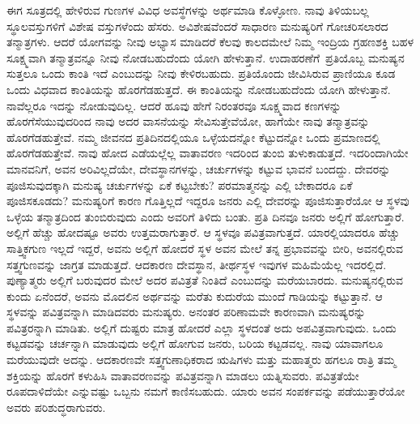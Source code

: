 ಈಗ ಸೂತ್ರದಲ್ಲಿ ಹೇಳಿರುವ ಗುಣಗಳ ವಿವಿಧ ಅವಸ್ಥೆಗಳನ್ನು ಅರ್ಥಮಾಡಿ ಕೊಳ್ಳೋಣ. ನಾವು ತಿಳಿಯಬಲ್ಲ ಸ್ಥೂಲವಸ್ತುಗಳಿಗೆ ವಿಶೇಷ ವಸ್ತುಗಳೆಂದು ಹೆಸರು. ಅವಿಶೇಷವೆಂದರೆ ಸಾಧಾರಣ ಮನುಷ್ಯರಿಗೆ ಗೋಚರಿಸಲಾರದ ತನ್ಮಾತ್ರಗಳು. ಆದರೆ ಯೋಗವನ್ನು ನೀವು ಅಭ್ಯಾಸ ಮಾಡಿದರೆ ಕೆಲವು ಕಾಲದಮೇಲೆ ನಿಮ್ಮ ಇಂದ್ರಿಯ ಗ್ರಹಣಶಕ್ತಿ ಬಹಳ ಸೂಕ್ಷ್ಮವಾಗಿ ತನ್ಮಾತ್ರವನ್ನೂ ನೀವು ನೋಡಬಹುದೆಂದು ಯೋಗಿ ಹೇಳುತ್ತಾನೆ. ಉದಾಹರಣೆಗೆ\break\  ಪ್ರತಿಯೊಬ್ಬ ಮನುಷ್ಯನ ಸುತ್ತಲೂ ಒಂದು ಕಾಂತಿ ಇದೆ ಎಂಬುದನ್ನು ನೀವು ಕೇಳಿರಬಹುದು. ಪ್ರತಿಯೊಂದು ಜೀವಿಸಿರುವ ಪ್ರಾಣಿಯೂ ಕೂಡ ಒಂದು ವಿಧವಾದ ಕಾಂತಿಯನ್ನು ಹೊರಗೆಡಹುತ್ತದೆ. ಈ ಕಾಂತಿಯನ್ನು ನೋಡಬಹುದೆಂದು ಯೋಗಿ ಹೇಳುತ್ತಾನೆ. ನಾವೆಲ್ಲರೂ ಇದನ್ನು ನೋಡುವುದಿಲ್ಲ. ಆದರೆ ಹೂವು ಹೇಗೆ ನಿರಂತರವೂ ಸೂಕ್ಷ್ಮವಾದ ಕಣಗಳನ್ನು ಹೊರಗೆಸೆಯುವುದರಿಂದ ನಾವು ಅದರ ವಾಸನೆಯನ್ನು ಸೇವಿಸುತ್ತೇವೆಯೋ, ಹಾಗೆಯೇ ನಾವು ತನ್ಮಾತ್ರವನ್ನು ಹೊರಗೆಡಹುತ್ತೇವೆ. ನಮ್ಮ ಜೀವನದ ಪ್ರತಿದಿನದಲ್ಲಿಯೂ ಒಳ್ಳೆಯದನ್ನೋ ಕೆಟ್ಟುದನ್ನೋ ಒಂದು ಪ್ರಮಾಣದಲ್ಲಿ ಹೊರಗೆಡಹುತ್ತೇವೆ. ನಾವು ಹೋದ ಎಡೆಯಲ್ಲೆಲ್ಲ ವಾತಾವರಣ ಇದರಿಂದ ತುಂಬಿ ತುಳುಕಾಡುತ್ತದೆ. ಇದರಿಂದಾಗಿಯೇ ಮಾನವನಿಗೆ, ಅವನ ಅರಿವಿಲ್ಲದೆಯೇ, ದೇವಸ್ಥಾನಗಳನ್ನು, ಚರ್ಚುಗಳನ್ನು ಕಟ್ಟುವ ಭಾವನೆ ಬಂದದ್ದು. ದೇವರನ್ನು ಪೂಜಿಸುವುದಕ್ಕಾಗಿ ಮನುಷ್ಯ ಚರ್ಚುಗಳನ್ನು ಏಕೆ ಕಟ್ಟಬೇಕು? ಪರಮಾತ್ಮನನ್ನು ಎಲ್ಲಿ ಬೇಕಾದರೂ ಏಕೆ ಪೂಜಿಸಕೂಡದು? ಮನುಷ್ಯರಿಗೆ ಕಾರಣ ಗೊತ್ತಿಲ್ಲದೆ ಇದ್ದರೂ ಜನರು ಎಲ್ಲಿ ದೇವರನ್ನು ಪೂಜಿಸುತ್ತಾರೆಯೋ ಆ ಸ್ಥಳವು ಒಳ್ಳೆಯ ತನ್ಮಾತ್ರದಿಂದ ತುಂಬಿರುವುದು ಎಂದು ಅವರಿಗೆ ತಿಳಿದು ಬಂತು. ಪ್ರತಿ ದಿನವೂ ಜನರು ಅಲ್ಲಿಗೆ ಹೋಗುತ್ತಾರೆ. ಅಲ್ಲಿಗೆ ಹೆಚ್ಚು ಹೋದಷ್ಟೂ ಅವರು ಉತ್ತಮರಾಗುತ್ತಾರೆ. ಆ ಸ್ಥಳವೂ ಪವಿತ್ರವಾಗುತ್ತದೆ. ಯಾರಲ್ಲಿಯಾದರೂ ಹೆಚ್ಚು ಸಾತ್ತ್ವಿಕಗುಣ ಇಲ್ಲದೆ ಇದ್ದರೆ, ಅವನು ಅಲ್ಲಿಗೆ ಹೋದರೆ ಸ್ಥಳ ಅವನ ಮೇಲೆ ತನ್ನ ಪ್ರಭಾವವನ್ನು ಬೀರಿ, ಅವನಲ್ಲಿರುವ ಸತ್ತ್ವಗುಣವನ್ನು ಜಾಗ್ರತ ಮಾಡುತ್ತದೆ. ಆದಕಾರಣ ದೇವಸ್ಥಾನ, ತೀರ್ಥಸ್ಥಳ ಇವುಗಳ ಮಹಿಮೆಯೆಲ್ಲ ಇದರಲ್ಲಿದೆ. ಪುಣ್ಯಾತ್ಮರು ಅಲ್ಲಿಗೆ ಬರುವುದರ ಮೇಲೆ ಅದರ ಪವಿತ್ರತೆ ನಿಂತಿದೆ ಎಂಬುದನ್ನು ಮರೆಯಬಾರದು. ಮನುಷ್ಯನಲ್ಲಿರುವ ಕುಂದು ಏನೆಂದರೆ, ಅವನು ಮೊದಲಿನ ಅರ್ಥವನ್ನು ಮರೆತು ಕುದುರೆಯ ಮುಂದೆ ಗಾಡಿಯನ್ನು ಕಟ್ಟುತ್ತಾನೆ. ಆ ಸ್ಥಳವನ್ನು ಪವಿತ್ರವನ್ನಾಗಿ ಮಾಡಿದವರು ಮನುಷ್ಯರು. ಅನಂತರ ಪರಿಣಾಮವೇ ಕಾರಣವಾಗಿ ಮನುಷ್ಯರನ್ನು ಪವಿತ್ರರನ್ನಾಗಿ ಮಾಡಿತು. ಅಲ್ಲಿಗೆ ದುಷ್ಟರು ಮಾತ್ರ ಹೋದರೆ ಎಲ್ಲಾ ಸ್ಥಳದಂತೆ ಅದು ಅಪವಿತ್ರವಾಗುವುದು. ಒಂದು ಕಟ್ಟಡವನ್ನು ಚರ್ಚನ್ನಾಗಿ ಮಾಡುವುದು ಅಲ್ಲಿಗೆ ಹೋಗುವ ಜನರು, ಬರಿಯ ಕಟ್ಟಡವಲ್ಲ. ನಾವು ಯಾವಾಗಲೂ ಮರೆಯುವುದೇ ಅದನ್ನು. ಆದಕಾರಣವೇ ಸತ್ತ್ವಗುಣಾಧಿಕರಾದ ಋಷಿಗಳು ಮತ್ತು ಮಹಾತ್ಮರು ಹಗಲೂ ರಾತ್ರಿ ತಮ್ಮ ಶಕ್ತಿಯನ್ನು ಹೊರಗೆ ಕಳುಹಿಸಿ ವಾತಾವರಣವನ್ನು ಪವಿತ್ರವನ್ನಾಗಿ ಮಾಡಲು ಯತ್ನಿಸುವರು. ಪವಿತ್ರತೆಯೇ ರೂಪದಾಳಿದೆಯೇ ಎನ್ನುವಷ್ಟು ಒಬ್ಬನು ನಮಗೆ ಕಾಣಿಸಬಹುದು. ಯಾರು ಅವನ ಸಂಪರ್ಕವನ್ನು ಪಡೆಯುತ್ತಾರೆಯೋ ಅವರು ಪರಿಶುದ್ಧರಾಗುವರು. 

